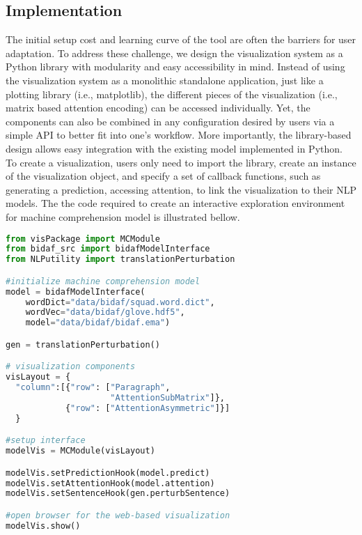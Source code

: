 \subsection{Implementation}
The initial setup cost and learning curve of the tool are often the barriers for user adaptation. To address these challenge, we design the visualization system as a Python library with modularity and easy accessibility in mind.
Instead of using the visualization system as a monolithic standalone application, just like a plotting library (i.e., matplotlib), the different pieces of the visualization (i.e., matrix based attention encoding) can be accessed individually.
% 
Yet, the components can also be combined in any configuration desired by users via a simple API to better fit into one's workflow.
More importantly, the library-based design allows easy integration with the existing model implemented in Python.
%
To create a visualization, users only need to import the library, create an instance of the visualization object, and specify a set of callback functions, such as generating a prediction, accessing attention, to link the visualization to their NLP models. The the code required to create an interactive exploration environment for machine comprehension model is illustrated bellow.

\begin{lstlisting}[language=Python, caption=Code for setting up the visualization system shown in the paper.]
from visPackage import MCModule
from bidaf_src import bidafModelInterface
from NLPutility import translationPerturbation

#initialize machine comprehension model
model = bidafModelInterface(
    wordDict="data/bidaf/squad.word.dict",
    wordVec="data/bidaf/glove.hdf5",
    model="data/bidaf/bidaf.ema")

gen = translationPerturbation()

# visualization components
visLayout = {
  "column":[{"row": ["Paragraph", 
                     "AttentionSubMatrix"]},
            {"row": ["AttentionAsymmetric"]}]
  }

#setup interface
modelVis = MCModule(visLayout)

modelVis.setPredictionHook(model.predict)
modelVis.setAttentionHook(model.attention)
modelVis.setSentenceHook(gen.perturbSentence)

#open browser for the web-based visualization
modelVis.show()
\end{lstlisting}




